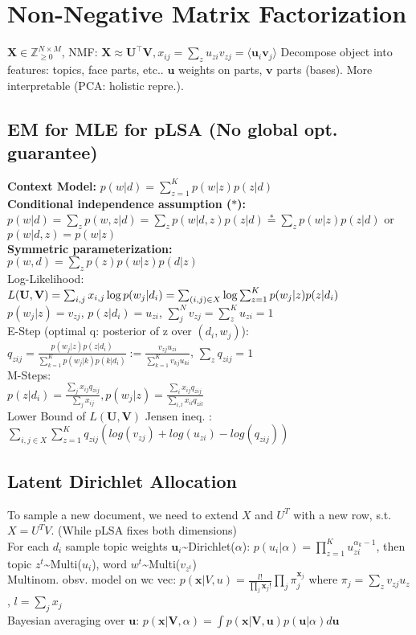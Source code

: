 \section{Non-Negative Matrix Factorization}
$\mathbf{X} \in \mathbb{Z}^{N \times M}_{\geq 0}$, NMF: $\mathbf{X} \approx \mathbf{U^\top V}, x_{ij}=\sum_z{u_{zi}v_{zj}}=\langle\mathbf{u}_i \mathbf{v}_j\rangle$
Decompose object into features: topics, face parts, etc.. $\mathbf{u}$ weights on parts, $\mathbf{v}$ parts (bases). More interpretable (PCA: holistic repre.).

\subsection*{EM for MLE for pLSA (No global opt. guarantee)}
\textbf{Context Model:} $p(w | d) = \sum_{z=1}^K p(w | z) p(z | d)$\\
\textbf{Conditional independence assumption ($*$):}\\
$p(w|d) = \sum_z p(w,z|d) = \sum_z p(w|d,z)p(z|d) \stackrel{*}{=} \sum_z p(w|z)p(z|d)$ or $p(w|d,z) = p(w|z)$\\
\textbf{Symmetric parameterization:}\\
$p(w, d) = \sum_z p(z)p(w | z) p(d | z)$ \\
Log-Likelihood: $L(\mathbf{U}, \mathbf{V}) = \sum_{i,j} x_{i,j}\log p(w_j|d_i) \\
= \sum_{(i,j) \in X} \log \sum_{z=1}^K p(w_j|z)p(z|d_i)$ \\ 
$ p(w_j|z) = v_{zj}$, $p(z|d_i) = u_{zi}$, $\sum_j^N v_{zj} = \sum_z^K u_{zi} = 1$\\
E-Step (optimal q: posterior of z over $(d_i, w_j)$):\\
$q_{zij} = \frac{p(w_j|z)p(z|d_i)}{\sum_{k=1}^K p(w_j|k)p(k|d_i)} := \frac{v_{zj}u_{zi}}{\sum_{k=1}^K v_{kj}u_{ki}}$, $\sum_z q_{zij}=1$\\
M-Steps:\\
$p(z|d_i) = \frac{\sum_j x_{ij}q_{zij}}{\sum_j x_{ij}}, p(w_j|z) = \frac{\sum_i x_{ij}q_{zij}}{\sum_{i,l}x_{il}q_{zil}}$\\
Lower Bound of $L(\mathbf{U}, \mathbf{V})$ Jensen ineq. :  $\sum_{i,j \in X}  \sum_{z=1}^K q_{zij}( log(v_{zj})+ log(u_{zi}) - log(q_{zij}))$

\subsection*{Latent Dirichlet Allocation}
To sample a new document, we need to extend $X$ and $U^T$ with a new row, s.t. $X=U^T V$. (While pLSA fixes both dimensions)\\
For each $d_i$ sample topic weights $\mathbf{u}_i$\textasciitilde Dirichlet($\alpha$): $p(u_i|\alpha) = \prod_{z=1}^K u_{zi}^{\alpha_k-1}$, then topic $z^t$\textasciitilde Multi($u_i$), word $w^t$\textasciitilde Multi($v_{z^t}$)\\
Multinom. obsv. model on wc vec: $p(\mathbf{x}|V,u) = \frac{l!}{\prod_j \mathbf{x}_j!}\prod_j \pi_j^{\mathbf{x}_j}$ 
where $\pi_j=\sum_z v_{zj} u_z$, $l=\sum_j x_j$ \\
Bayesian averaging over $\mathbf{u}$: $p(\mathbf{x}|\mathbf{V},\alpha)=\int p(\mathbf{x}|\mathbf{V},\mathbf{u})p(\mathbf{u}|\alpha)d\mathbf{u}$

